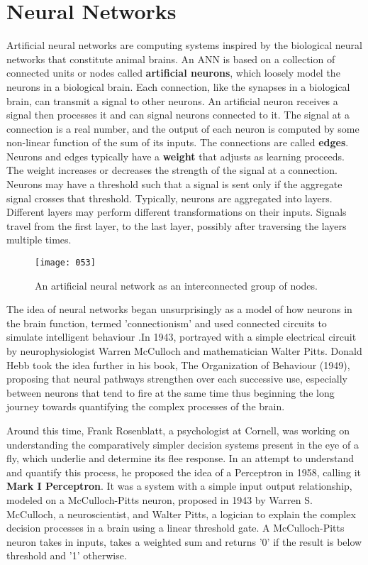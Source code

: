 \chapter{Neural Networks}
Artificial neural networks are computing systems inspired by the biological neural networks that constitute animal brains. An ANN is based on a collection of connected units or nodes called \textbf{artificial neurons}, which loosely model the neurons in a biological brain. Each connection, like the synapses in a biological brain, can transmit a signal to other neurons. An artificial neuron receives a signal then processes it and can signal neurons connected to it. The signal at a connection is a real number, and the output of each neuron is computed by some non-linear function of the sum of its inputs. The connections are called \textbf{edges}. Neurons and edges typically have a \textbf{weight} that adjusts as learning proceeds. The weight increases or decreases the strength of the signal at a connection. Neurons may have a threshold such that a signal is sent only if the aggregate signal crosses that threshold. Typically, neurons are aggregated into layers. Different layers may perform different transformations on their inputs. Signals travel from the first layer, to the last layer, possibly after traversing the layers multiple times.

\begin{wrapfigure}{l}{0.35\textwidth}
    \begin{center}
        \texttt{[image: 053]}
        \caption{An artificial neural network as an interconnected group of nodes.}
    \end{center}
    \label{fig:053}
\end{wrapfigure}

The idea of neural networks began unsurprisingly as a model of how neurons in the brain function, termed 'connectionism' and used connected circuits to simulate intelligent behaviour .In 1943, portrayed with a simple electrical circuit by neurophysiologist Warren McCulloch and mathematician Walter Pitts. Donald Hebb took the idea further in his book, The Organization of Behaviour (1949), proposing that neural pathways strengthen over each successive use, especially between neurons that tend to fire at the same time thus beginning the long journey towards quantifying the complex processes of the brain.

Around this time, Frank Rosenblatt, a psychologist at Cornell, was working on understanding the comparatively simpler decision systems present in the eye of a fly, which underlie and determine its flee response. In an attempt to understand and quantify this process, he proposed the idea of a Perceptron in 1958, calling it \textbf{Mark I Perceptron}. It was a system with a simple input output relationship, modeled on a McCulloch-Pitts neuron, proposed in 1943 by Warren S. McCulloch, a neuroscientist, and Walter Pitts, a logician to explain the complex decision processes in a brain using a linear threshold gate. A McCulloch-Pitts neuron takes in inputs, takes a weighted sum and returns '0' if the result is below threshold and '1' otherwise.

